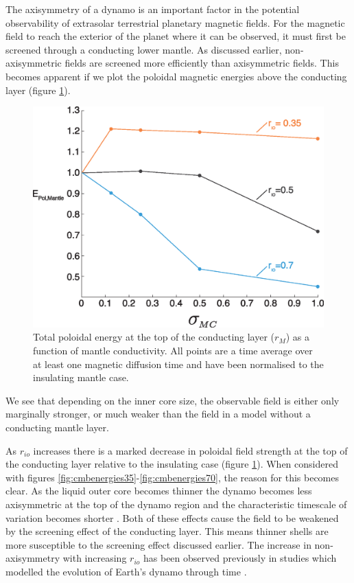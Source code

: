 The axisymmetry of a dynamo is an important factor in the potential observability of extrasolar terrestrial planetary magnetic fields. For the magnetic field to reach the exterior of the planet where it can be observed, it must first be screened through a conducting lower mantle. As  discussed earlier, non-axisymmetric fields are screened more efficiently than axisymmetric fields. This becomes apparent if we plot the poloidal magnetic energies above the conducting layer (figure \ref{fig:ddppoloidaltotal}).
\begin{figure}
\noindent\includegraphics[width=.7\linewidth]{Chapter3/Figures/f4.eps}
\centering
\caption{Total poloidal energy at the top of the conducting layer ($r_{M}$) as a function of mantle conductivity. All points are a time average over at least one magnetic diffusion time and have been normalised to the insulating mantle case.}
\label{fig:ddppoloidaltotal}
\end{figure}
We see that depending on the inner core size, the observable field is either only marginally stronger, or much weaker than the field in a model without a conducting mantle layer.

As $r_{io}$ increases there is a marked decrease in poloidal field strength at the top of the conducting layer relative to the insulating case (figure \ref{fig:ddppoloidaltotal}). When considered with figures \ref{fig:cmbenergies35}-\ref{fig:cmbenergies70}, the reason for this becomes clear. As the liquid outer core becomes thinner the dynamo becomes less axisymmetric at the top of the dynamo region and the characteristic timescale of variation becomes shorter \citep{aubert2009}. Both of these effects cause the field to be weakened by the screening effect of the conducting layer. This means thinner shells are more susceptible to the screening effect discussed earlier. The increase in non-axisymmetry with increasing $r_{io}$ has been observed previously in studies which modelled the evolution of Earth's dynamo through time \citep{aubert2009, roberts2001}.

